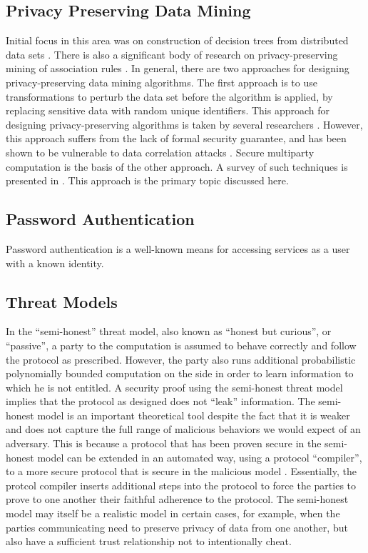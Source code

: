 \subsection{Privacy Preserving Data Mining }

Initial focus in this area was on construction of decision trees from
distributed data sets \cite{Agrawal-Srikant,Lindell-Pinkas}. There
is also a significant body of research on privacy-preserving mining
of association rules \cite{Gehrke:2002,RizviHarista,VaidyaClifton:2002}.
In general, there are two approaches for designing privacy-preserving
data mining algorithms. The first approach is to use transformations
to perturb the data set before the algorithm is applied, by replacing
sensitive data with random unique identifiers. This approach for designing
privacy-preserving algorithms is taken by several researchers \cite{Klusch,MeruguGhosh,Oliveira}.
However, this approach suffers from the lack of formal security guarantee,
and has been shown to be vulnerable to data correlation attacks \cite{Malin04}.
Secure multiparty computation is the basis of the other approach.
A survey of such techniques is presented in \cite{PinkasCryptoPPDM02}.
This approach is the primary topic discussed here.

\subsection{Password Authentication}
Password authentication is a well-known means for accessing services as a user with a known
identity.

\subsection{Threat Models\label{sub:Threat-Models}}

In the {}``semi-honest'' threat model, also known as {}``honest
but curious'', or {}``passive'', a party to the computation is
assumed to behave correctly and follow the protocol as prescribed.
However, the party also runs additional probabilistic polynomially
bounded computation on the side in order to learn information to which
he is not entitled. A security proof using the semi-honest threat
model implies that the protocol as designed does not {}``leak''
information. The semi-honest model is an important theoretical tool
despite the fact that it is weaker and does not capture the full range
of malicious behaviors we would expect of an adversary. This is because
a protocol that has been proven secure in the semi-honest model can
be extended in an automated way, using a protocol {}``compiler'',
to a more secure protocol that is secure in the malicious model \cite{GMW87}.
Essentially, the protcol compiler inserts additional steps into the
protocol to force the parties to prove to one another their faithful
adherence to the protocol. The semi-honest model may itself be a realistic
model in certain cases, for example, when the parties communicating
need to preserve privacy of data from one another, but also have a
sufficient trust relationship not to intentionally cheat.

